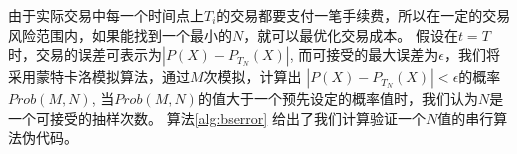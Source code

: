 \begin{comment}
An alternative solution is to hedge only at discrete tiems. In fact, assume that the 
investor will trade at $N$ fixed times in period $(0, T)$. At each trading time
defined by $t_k=kT/N$, $(k\in \{0,...,N\})$, the trader holds $\xi_{t_k}$ units of
the asset $X_t$. Hence, at maturity the investor will be left with the difference:
\[
\begin{split}
M_T^N
&=e^{-rT}f(X_T)-(u(0,x)+\int_0^T\frac{\partial u}{\partial x}(\varphi(t), 
X_{\varphi_t}))d\widetilde{X}_t\\
&=\int_0^T\frac{\partial u}{\partial x}(t, X_t)d\widetilde{X}_t-\int_0^T\frac{\    partial u}{\partial x}(\varphi(t), X_{\varphi(t)})d\widetilde{X}_t
\end{split}
\]
where $\varphi(t)=sup\{t_i | t_i\leq t \}$.
\end{comment}

由于实际交易中每一个时间点上$T_i$的交易都要支付一笔手续费，所以在一定的交易风险范围内，如果能找到一个最小的$N$，就可以最优化交易成本。
假设在$t=T$时，交易的误差可表示为$|P(X) - P_{T_N}(X)|$, 而可接受的最大误差为$\epsilon$，我们将采用蒙特卡洛模拟算法，通过$M$次模拟，计算出
$|P(X) - P_{T_N}(X)| < \epsilon$的概率$Prob(M,N)$, 当$Prob(M,N)$的值大于一个预先设定的概率值时，我们认为$N$是一个可接受的抽样次数。
算法\ref{alg:bserror} 给出了我们计算验证一个$N$值的串行算法伪代码。

